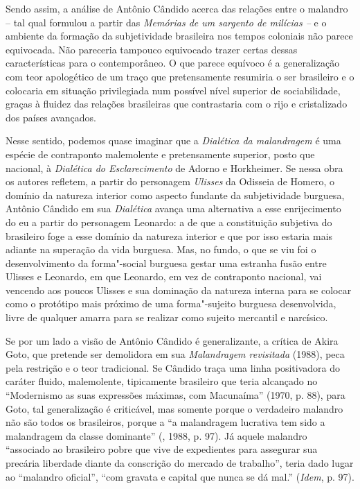 Sendo assim, a análise de Antônio Cândido acerca das relações entre o
malandro -- tal qual formulou a partir das \emph{Memórias de um sargento
de milícias --} e o ambiente da formação da subjetividade brasileira nos
tempos coloniais não parece equivocada. Não pareceria tampouco
equivocado trazer certas dessas características para o contemporâneo. O
que parece equívoco é a generalização com teor apologético de um traço
que pretensamente resumiria o ser brasileiro e o colocaria em situação
privilegiada num possível nível superior de sociabilidade, graças à
fluidez das relações brasileiras que contrastaria com o rijo e
cristalizado dos países avançados.

Nesse sentido, podemos quase imaginar que a \emph{Dialética da
malandragem} é uma espécie de contraponto malemolente e pretensamente
superior, posto que nacional, à \emph{Dialética do Esclarecimento} de
Adorno e Horkheimer. Se nessa obra os autores refletem, a partir do
personagem \emph{Ulisses} da Odisseia de Homero, o domínio da natureza
interior como aspecto fundante da subjetividade burguesa, Antônio
Cândido em sua \emph{Dialética} avança uma alternativa a esse
enrijecimento do eu a partir do personagem Leonardo: a de que a
constituição subjetiva do brasileiro foge a esse domínio da natureza
interior e que por isso estaria mais adiante na superação da vida
burguesa. Mas, no fundo, o que se viu foi o desenvolvimento da
forma"-social burguesa gestar uma estranha fusão entre Ulisses e
Leonardo, em que Leonardo, em vez de contraponto nacional, vai vencendo
aos poucos Ulisses e sua dominação da natureza interna para se colocar
como o protótipo mais próximo de uma forma"-sujeito burguesa
desenvolvida, livre de qualquer amarra para se realizar como sujeito
mercantil e narcísico.

Se por um lado a visão de Antônio Cândido é generalizante, a crítica de
Akira Goto, que pretende ser demolidora em sua \emph{Malandragem
revisitada} (1988), peca pela restrição e o teor tradicional. Se Cândido
traça uma linha positivadora do caráter fluido, malemolente, tipicamente
brasileiro que teria alcançado no ``Modernismo as suas expressões
máximas, com Macunaíma'' (1970, p. 88), para Goto, tal generalização é
criticável, mas somente porque o verdadeiro malandro não são todos os
brasileiros, porque a ``a malandragem lucrativa tem sido a malandragem
da classe dominante'' (, 1988, p. 97). Já aquele malandro
``associado ao brasileiro pobre que vive de expedientes para assegurar
sua precária liberdade diante da conscrição do mercado de trabalho'',
teria dado lugar ao ``malandro oficial'', ``com gravata e capital que
nunca se dá mal.'' (\emph{Idem}, p. 97).

